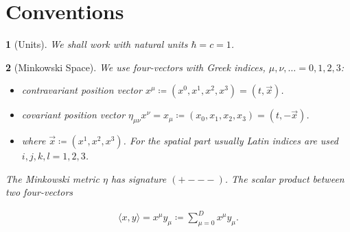\documentclass{article}
\theoremstyle{plain} %
\theoremstyle{convention} %
\newtheorem*{convention}{} %
\theoremstyle{remark} %
\numberwithin{equation}{section}
\begin{document}

\section{Conventions}

\begin{convention}[Units]
We shall work with natural units $\hbar = c = 1$.
\end{convention}

\begin{convention}[Minkowski Space]
We use four-vectors with Greek indices, $\mu, \nu, \dots = 0, 1, 2, 3$:
\begin{itemize}
  \item contravariant position vector $x^{\mu} \coloneqq (x^0, x^1, x^2, x^3) = (t, \vec{x})$.
  \item covariant position vector $\eta_{\mu \nu} x^{\nu} = x_{\mu} \coloneqq (x_0, x_1, x_2, x_3) = (t, -\vec{x})$.
  \item where $\vec{x} \coloneqq (x^1, x^2, x^3)$. For the spatial part usually Latin indices are used $i,j,k,l = 1, 2, 3$.
\end{itemize}

The Minkowski metric $\eta$ has signature $(+---)$. The scalar product between two four-vectors

\begin{align*}
  \langle x, y \rangle = x^{\mu} y_{\mu} \coloneqq \sum_{\mu=0}^D x^{\mu} y_{\mu}.
\end{align*}

\end{convention}
\end{document}
